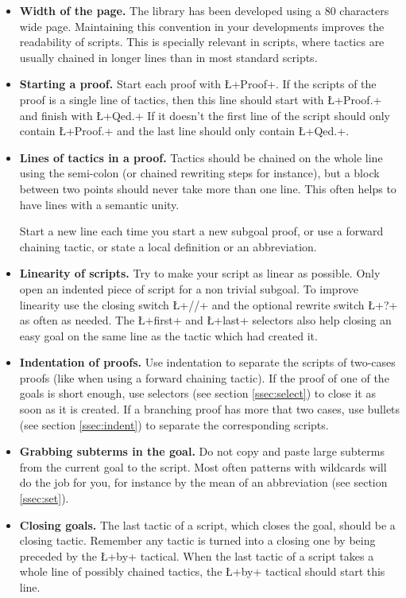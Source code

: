 \begin{itemize}
\item {\bf Width of the page.} The library has been developed using a
  80 characters wide page. Maintaining this convention in your
  developments improves the readability of scripts. This is specially
  relevant in \ssr{} scripts, where tactics are usually chained in
  longer lines than in most standard \Coq{} scripts.

\item{\bf Starting a proof.} Start each proof with
  \L+Proof+. If the scripts of the proof is a single line of tactics,
  then this line should start with \L+Proof.+ and finish with \L+Qed.+
  If it doesn't the first line of the script should only contain
  \L+Proof.+ and the last line should only contain \L+Qed.+.


\item {\bf Lines of tactics in a proof.} Tactics should be chained on
  the whole line using the semi-colon (or chained rewriting steps for
  instance), but a block between two points should never take more
  than one line. This often helps to have lines with a semantic unity.

  Start a new line each time you start a new subgoal
  proof, or use a forward chaining tactic, or state a local definition
  or an abbreviation.

\item{\bf Linearity of scripts.} Try to make your script as linear as
  possible. Only open an indented piece of script for a non trivial
  subgoal. To improve linearity use the closing switch \L+//+ and the
  optional rewrite switch \L+?+ as often as needed. The
  \L+first+ and \L+last+ selectors also help closing an easy goal on the
  same line as the tactic which had created it.

\item {\bf Indentation of proofs.} Use indentation to separate the
  scripts of two-cases proofs (like when using a forward
  chaining tactic). If the proof of one of the goals is short enough,
  use selectors (see section \ref{ssec:select}) to close it as soon
  as it is created. If a branching proof has more that two cases,
  use bullets (see section \ref{ssec:indent}) to separate the
  corresponding scripts.

\item{\bf Grabbing subterms in the goal. } Do not copy and paste large
  subterms from the current goal to the script. Most often patterns
  with wildcards
  will do the job for you, for instance by the mean of an abbreviation
  (see section \ref{ssec:set}).

\item {\bf Closing goals.} The last tactic of a script, which  closes
  the goal, should be a closing tactic. Remember any tactic is turned
  into a closing one by being preceded by the \L+by+ tactical. When
  the last tactic of a script takes a whole line of possibly chained
  tactics, the \L+by+ tactical should start this line.


\end{itemize}

